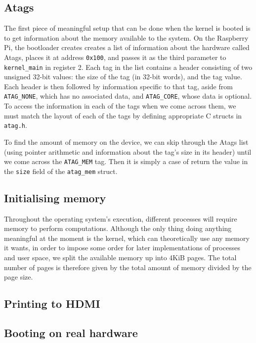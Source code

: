 \documentclass[10pt,a4paper]{article}
\newcommand{\code}[1]{\texttt{#1}}
\begin{document}
\subsection{Atags}
The first piece of meaningful setup that can be done when the kernel is booted
is to get information about the memory available to the system. On the Raspberry
Pi, the bootloader creates creates a list of information about the hardware
called Atags, places it at address \code{0x100}, and passes it as the third
parameter to \code{kernel\_main} in register 2. Each tag in the list contains a
header consisting of two unsigned 32-bit values: the size of the tag (in 32-bit
words), and the tag value. Each header is then followed by information specific
to that tag, aside from \code{ATAG\_NONE}, which has no associated data, and
\code{ATAG\_CORE}, whose data is optional. To access the information in each of
the tags when we come across them, we must match the layout of each of the tags
\cite{atags} by defining appropriate C structs in \code{atag.h}.

To find the amount of memory on the device, we can skip through the Atags list
(using pointer arithmetic and information about the tag's size in its header)
until we come across the \code{ATAG\_MEM} tag. Then it is simply a case of
return the value in the \code{size} field of the \code{atag\_mem} struct.

\subsection{Initialising memory}
Throughout the operating system's execution, different processes will require
memory to perform computations. Although the only thing doing anything
meaningful at the moment is the kernel, which can theoretically use any memory
it wants, in order to impose some order for later implementations of processes
and user space, we split the available memory up into 4KiB pages. The total
number of pages is therefore given by the total amount of memory divided by the
page size.

\subsection{Printing to HDMI}
\subsection{Booting on real hardware}

\end{document}
